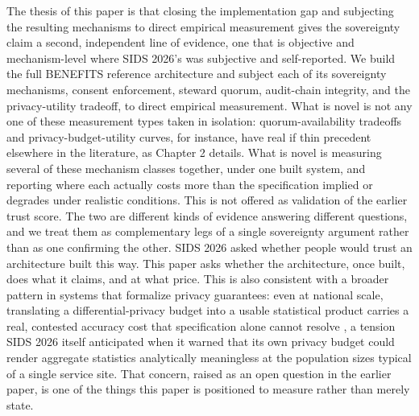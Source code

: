 The thesis of this paper is that closing the implementation gap and subjecting the resulting mechanisms to direct empirical measurement gives the sovereignty claim a second, independent line of evidence, one that is objective and mechanism-level where SIDS 2026's was subjective and self-reported. We build the full BENEFITS reference architecture and subject each of its sovereignty mechanisms, consent enforcement, steward quorum, audit-chain integrity, and the privacy-utility tradeoff, to direct empirical measurement. What is novel is not any one of these measurement types taken in isolation: quorum-availability tradeoffs and privacy-budget-utility curves, for instance, have real if thin precedent elsewhere in the literature, as Chapter 2 details. What is novel is measuring several of these mechanism classes together, under one built system, and reporting where each actually costs more than the specification implied or degrades under realistic conditions. This is not offered as validation of the earlier trust score. The two are different kinds of evidence answering different questions, and we treat them as complementary legs of a single sovereignty argument rather than as one confirming the other. SIDS 2026 asked whether people would trust an architecture built this way. This paper asks whether the architecture, once built, does what it claims, and at what price. This is also consistent with a broader pattern in systems that formalize privacy guarantees: even at national scale, translating a differential-privacy budget into a usable statistical product carries a real, contested accuracy cost that specification alone cannot resolve \cite{abowd2022}, a tension SIDS 2026 itself anticipated when it warned that its own privacy budget could render aggregate statistics analytically meaningless at the population sizes typical of a single service site. That concern, raised as an open question in the earlier paper, is one of the things this paper is positioned to measure rather than merely state.

